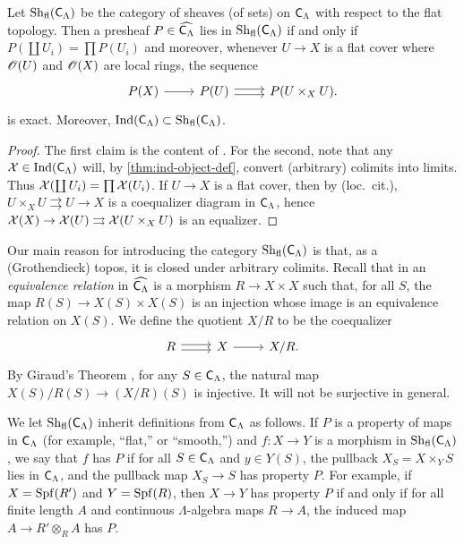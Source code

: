 \documentclass[phd,cornellheadings,draft]{cornell}
\begin{document}
\begin{lemma}
Let $\operatorname{Sh}_{\mathrm{fl}}(\mathsf{C}_\Lambda)$ be the category of sheaves (of sets) on 
$\mathsf{C}_\Lambda$ with respect to the flat topology. Then a presheaf 
$P\in \widehat{\mathsf{C}_\Lambda}$ lies in $\operatorname{Sh}_{\mathrm{fl}}(\mathsf{C}_\Lambda)$ if 
and only if $P(\coprod U_i) = \prod P(U_i)$ and moreover, whenever 
$U \to X$ is a flat cover where $\mathscr{O}(U)$ and $\mathscr{O}(X)$ are local rings, the 
sequence 
\[
\begin{tikzcd}
	P(X) \ar[r]
		& P(U) \ar[r, shift left=.5ex] \ar[r, shift right=.5ex]
		& P(U\times_X U) .
\end{tikzcd}
\]
is exact. Moreover, 
$\operatorname{Ind}(\mathsf{C}_\Lambda)\subset \operatorname{Sh}_{\mathrm{fl}}(\mathsf{C}_\Lambda)$. 
\end{lemma}
\begin{proof}
The first claim is the content of \cite[IV 6.3.1(ii)]{sga3-1}. For the second, 
note that any $\mathcal{X}\in \operatorname{Ind}(\mathsf{C}_\Lambda)$ will, by 
\ref{thm:ind-object-def}, convert (arbitrary) colimits into limits. Thus 
$\mathcal{X}(\coprod U_i) = \prod \mathcal{X}(U_i)$. If $U\to X$ is a flat cover, then by (loc.~cit.), $U\times_X U\rightrightarrows U\to X$ is a coequalizer diagram in 
$\mathsf{C}_\Lambda$, hence 
$\mathcal{X}(X)\to \mathcal{X}(U)\rightrightarrows \mathcal{X}(U\times_X U)$ is an equalizer. 
\end{proof}

Our main reason for introducing the category $\operatorname{Sh}_{\mathrm{fl}}(\mathsf{C}_\Lambda)$ 
is that, as a (Grothendieck) topos, it is closed under arbitrary colimits. 
Recall that in an \emph{equivalence relation} in $\widehat{\mathsf{C}_\Lambda}$ 
is a morphism $R\to X\times X$ such that, for all $S$, the map 
$R(S)\to X(S)\times X(S)$ is an injection whose image is an equivalence 
relation on $X(S)$. We define the quotient $X/R$ to be the coequalizer 
\[
\begin{tikzcd}
	R \ar[r, shift left=.5ex] \ar[r, shift right=.5ex]
		& X \ar[r]
		& X/R .
\end{tikzcd}
\]
By Giraud's Theorem \cite[App.]{maclane-moerdijk-1994}, for any 
$S\in \mathsf{C}_\Lambda$, the natural map $X(S)/R(S)\to (X/R)(S)$ is injective. 
It will not be surjective in general. 

We let $\operatorname{Sh}_{\mathrm{fl}}(\mathsf{C}_\Lambda)$ inherit definitions from 
$\mathsf{C}_\Lambda$ as follows. If $P$ is a property of maps in 
$\mathsf{C}_\Lambda$ (for example, ``flat,'' or ``smooth,'') and 
$f\colon X\to Y$ is a morphism in $\operatorname{Sh}_{\mathrm{fl}}(\mathsf{C}_\Lambda)$, we say 
that $f$ has $P$ if for all $S\in \mathsf{C}_\Lambda$ and $y\in Y(S)$, the 
pullback $X_S=X\times_Y S$ lies in $\mathsf{C}_\Lambda$, and the pullback map 
$X_S\to S$ has property $P$. For example, if $X=\operatorname{Spf}(R')$ and $Y=\operatorname{Spf}(R)$, then 
$X\to Y$ has property $P$ if and only if for all finite length $A$ and 
continuous $\Lambda$-algebra maps $R\to A$, the induced map 
$A\to R'\otimes_R A$ has $P$.
\end{document}
